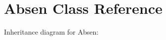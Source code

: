 \hypertarget{class_absen}{}\section{Absen Class Reference}
\label{class_absen}


Inheritance diagram for Absen\+:
